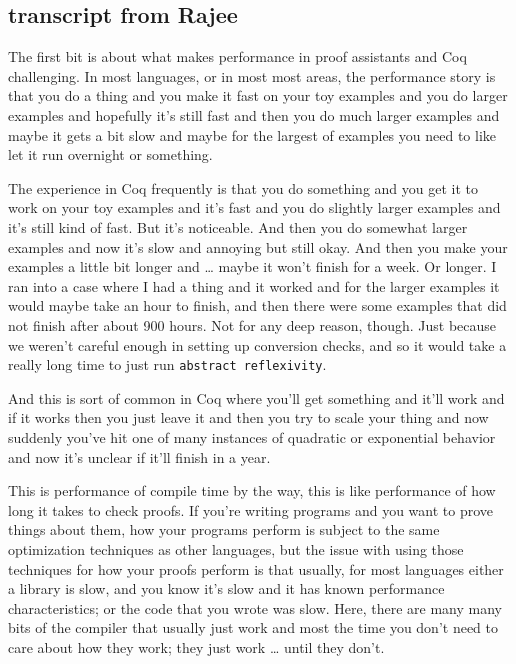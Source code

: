 \begin{subappendices}
    
    \section{transcript from Rajee}
The first bit is about what makes performance in proof assistants and Coq challenging. In most languages, or in most most areas, the performance story is that you do a thing and you make it fast on your toy examples and you do larger examples and hopefully it's still fast and then you do much larger examples and maybe it gets a bit slow and maybe for the largest of examples you need to like let it run overnight or something. 

The experience in Coq frequently is that you do something and you get it to work on your toy examples and it's fast and you do slightly larger examples and it's still kind of fast. But it's noticeable. And then you do somewhat larger examples and now it's slow and annoying but still okay.  And then you make your examples a little bit longer and \ldots{} maybe it won't finish for a week. Or longer.  I ran into a case where I had a thing and it worked and for the larger examples it would maybe take an hour to finish, and then there were some examples that did not finish after about 900 hours.  Not for any deep reason, though.  Just because we weren't careful enough in setting up conversion checks, and so it would take a really long time to just run \texttt{abstract reflexivity}.

And this is sort of common in Coq where you'll get something and it'll work and if it works then you just leave it and then you try to scale your thing and now suddenly you've hit one of many instances of quadratic or exponential behavior and now it's unclear if it'll finish in a year.

This is performance of compile time by the way, this is like performance of how long it takes to check proofs.  If you're writing programs and you want to prove things about them, how your programs perform is subject to the same optimization techniques as other languages, but the issue with using those techniques for how your proofs perform is that usually, for most languages either a library is slow, and you know it's slow and it has known performance characteristics; or the code that you wrote was slow. Here, there are many many bits of the compiler that usually just work and most the time you don't need to care about how they work; they just work \ldots{} until they don't.


\end{subappendices}
